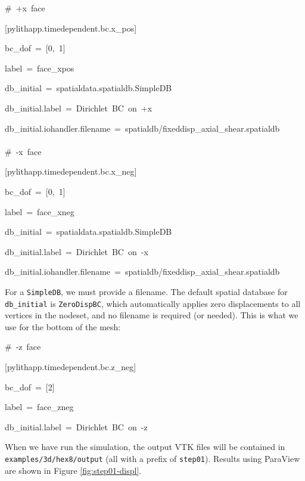 \begin{lyxcode}
\#~+x~face

{[}pylithapp.timedependent.bc.x\_pos{]}

bc\_dof~=~{[}0,~1{]}

label~=~face\_xpos

db\_initial~=~spatialdata.spatialdb.SimpleDB

db\_initial.label~=~Dirichlet~BC~on~+x

db\_initial.iohandler.filename~=~spatialdb/fixeddisp\_axial\_shear.spatialdb~\\
~\\


\#~-x~face

{[}pylithapp.timedependent.bc.x\_neg{]}

bc\_dof~=~{[}0,~1{]}

label~=~face\_xneg

db\_initial~=~spatialdata.spatialdb.SimpleDB

db\_initial.label~=~Dirichlet~BC~on~-x

db\_initial.iohandler.filename~=~spatialdb/fixeddisp\_axial\_shear.spatialdb
\end{lyxcode}
For a \texttt{SimpleDB}, we must provide a filename. The default spatial
database for \texttt{db\_initial} is \texttt{ZeroDispBC}, which automatically
applies zero displacements to all vertices in the nodeset, and no
filename is required (or needed). This is what we use for the bottom
of the mesh:
\begin{lyxcode}
\#~-z~face

{[}pylithapp.timedependent.bc.z\_neg{]}

bc\_dof~=~{[}2{]}

label~=~face\_zneg

db\_initial.label~=~Dirichlet~BC~on~-z
\end{lyxcode}
When we have run the simulation, the output VTK files will be contained
in \texttt{examples/3d/hex8/output} (all with a prefix of \texttt{step01}).
Results using ParaView are shown in Figure \ref{fig:step01-displ}.

